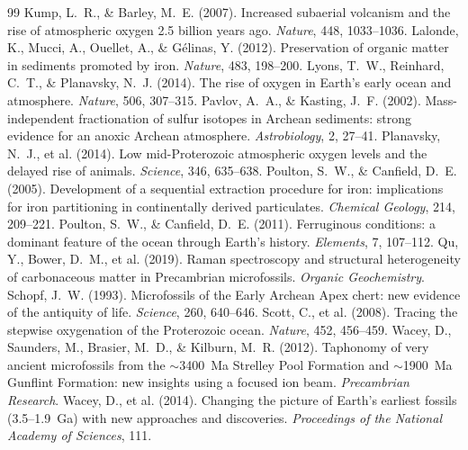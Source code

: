 \documentclass[11pt]{article}
\begin{document}
\begin{thebibliography}{99}
 Kump, L.~R., \& Barley, M.~E. (2007). Increased subaerial
volcanism and the rise of atmospheric oxygen 2.5 billion years ago. \textit{Nature}, 448,
1033--1036.
 Lalonde, K., Mucci, A., Ouellet, A., \& G\'{e}linas, Y.
(2012). Preservation of organic matter in sediments promoted by iron. \textit{Nature}, 483,
198--200.
 Lyons, T.~W., Reinhard, C.~T., \& Planavsky, N.~J. (2014).
The rise of oxygen in Earth's early ocean and atmosphere. \textit{Nature}, 506, 307--315.
 Pavlov, A.~A., \& Kasting, J.~F. (2002).
Mass-independent fractionation of sulfur isotopes in Archean sediments: strong evidence for an
anoxic Archean atmosphere. \textit{Astrobiology}, 2, 27--41.
 Planavsky, N.~J., et al. (2014). Low
mid-Proterozoic atmospheric oxygen levels and the delayed rise of animals. \textit{Science}, 346,
635--638.
 Poulton, S.~W., \& Canfield, D.~E. (2005).
Development of a sequential extraction procedure for iron: implications for iron partitioning in
continentally derived particulates. \textit{Chemical Geology}, 214, 209--221.
 Poulton, S.~W., \& Canfield, D.~E. (2011).
Ferruginous conditions: a dominant feature of the ocean through Earth's history. \textit{Elements},
7, 107--112.
 Qu, Y., Bower, D.~M., et al. (2019). Raman spectroscopy and
structural heterogeneity of carbonaceous matter in Precambrian microfossils. \textit{Organic
Geochemistry}.
 Schopf, J.~W. (1993). Microfossils of the Early Archean Apex
chert: new evidence of the antiquity of life. \textit{Science}, 260, 640--646.
 Scott, C., et al. (2008). Tracing the stepwise oxygenation
of the Proterozoic ocean. \textit{Nature}, 452, 456--459.
 Wacey, D., Saunders, M., Brasier, M.~D., \& Kilburn, M.~R.
(2012). Taphonomy of very ancient microfossils from the $\sim$3400~Ma Strelley Pool Formation and
$\sim$1900~Ma Gunflint Formation: new insights using a focused ion beam. \textit{Precambrian
Research}.
 Wacey, D., et al. (2014). Changing the picture of Earth's
earliest fossils (3.5--1.9~Ga) with new approaches and discoveries. \textit{Proceedings of the
National Academy of Sciences}, 111.

\end{thebibliography}
\end{document}
